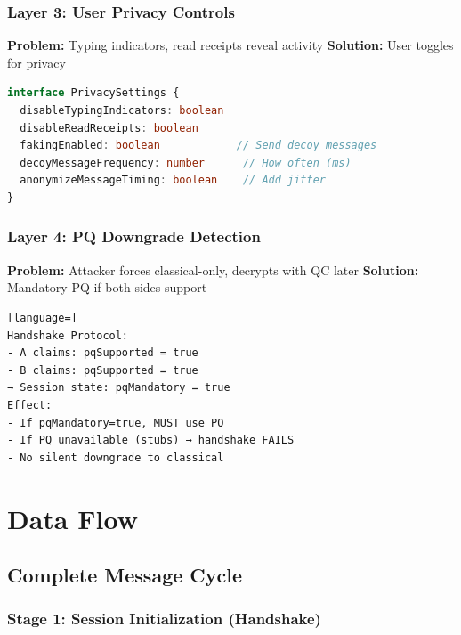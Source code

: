 \documentclass[11pt,a4paper,oneside]{book}
\begin{document}
\vspace{-0.2cm}\subsection{Layer 3: User Privacy Controls}
\textbf{Problem:} Typing indicators, read receipts reveal activity
\textbf{Solution:} User toggles for privacy
\begin{lstlisting}[language=TypeScript]
interface PrivacySettings {
  disableTypingIndicators: boolean
  disableReadReceipts: boolean
  fakingEnabled: boolean            // Send decoy messages
  decoyMessageFrequency: number      // How often (ms)
  anonymizeMessageTiming: boolean    // Add jitter
}
\end{lstlisting}
\vspace{-0.2cm}\subsection{Layer 4: PQ Downgrade Detection}
\textbf{Problem:} Attacker forces classical-only, decrypts with QC later
\textbf{Solution:} Mandatory PQ if both sides support
\begin{lstlisting}[language=]
Handshake Protocol:
- A claims: pqSupported = true
- B claims: pqSupported = true
→ Session state: pqMandatory = true
Effect:
- If pqMandatory=true, MUST use PQ
- If PQ unavailable (stubs) → handshake FAILS
- No silent downgrade to classical
\end{lstlisting}
\vspace{-0.5cm}\chapter{Data Flow}
\vspace{-0.3cm}\section{Complete Message Cycle}
\vspace{-0.2cm}\subsection{Stage 1: Session Initialization (Handshake)}
\end{document}
